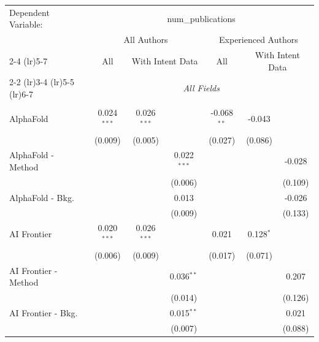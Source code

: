 \begingroup
\centering
\begin{tabular}{lcccccc}
   \tabularnewline \midrule \midrule
   Dependent Variable: & \multicolumn{6}{c}{num\_publications}\\
 & \multicolumn{3}{c}{All Authors} & \multicolumn{3}{c}{Experienced Authors} \\
\cmidrule(lr){2-4} \cmidrule(lr){5-7}
 & \multicolumn{1}{c}{All} & \multicolumn{2}{c}{With Intent Data} & \multicolumn{1}{c}{All} & \multicolumn{2}{c}{With Intent Data} \\
\cmidrule(lr){2-2} \cmidrule(lr){3-4} \cmidrule(lr){5-5} \cmidrule(lr){6-7}
 & \multicolumn{6}{c}{\textit{All Fields}} \\ \\
   AlphaFold            & 0.024$^{***}$ & 0.026$^{***}$ &               & -0.068$^{**}$ & -0.043      &   \\   
                        & (0.009)       & (0.005)       &               & (0.027)       & (0.086)     &   \\   
   AlphaFold - Method   &               &               & 0.022$^{***}$ &               &             & -0.028\\   
                        &               &               & (0.006)       &               &             & (0.109)\\   
   AlphaFold - Bkg.     &               &               & 0.013         &               &             & -0.026\\   
                        &               &               & (0.009)       &               &             & (0.133)\\   
   AI Frontier          & 0.020$^{***}$ & 0.026$^{***}$ &               & 0.021         & 0.128$^{*}$ &   \\   
                        & (0.006)       & (0.009)       &               & (0.017)       & (0.071)     &   \\   
   AI Frontier - Method &               &               & 0.036$^{**}$  &               &             & 0.207\\   
                        &               &               & (0.014)       &               &             & (0.126)\\   
   AI Frontier - Bkg.   &               &               & 0.015$^{**}$  &               &             & 0.021\\   
                        &               &               & (0.007)       &               &             & (0.088)\\   

\end{tabular}
